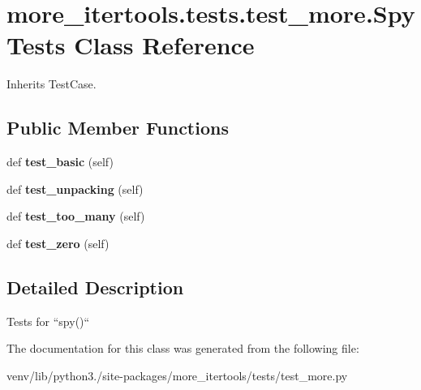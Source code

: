 \hypertarget{classmore__itertools_1_1tests_1_1test__more_1_1_spy_tests}{}\section{more\+\_\+itertools.\+tests.\+test\+\_\+more.\+Spy\+Tests Class Reference}
\label{classmore__itertools_1_1tests_1_1test__more_1_1_spy_tests}


Inherits Test\+Case.

\subsection*{Public Member Functions}
\begin{DoxyCompactItemize}
\item 
\mbox{\label{classmore__itertools_1_1tests_1_1test__more_1_1_spy_tests_a125e2532bf6fe68d4a9c34018a112f4f}} 
def {\bfseries test\+\_\+basic} (self)
\item 
\mbox{\label{classmore__itertools_1_1tests_1_1test__more_1_1_spy_tests_adb604952529d974b3f82d5656e399eb4}} 
def {\bfseries test\+\_\+unpacking} (self)
\item 
\mbox{\label{classmore__itertools_1_1tests_1_1test__more_1_1_spy_tests_a3c1e9741a72ad573f81e9d57db6a837e}} 
def {\bfseries test\+\_\+too\+\_\+many} (self)
\item 
\mbox{\label{classmore__itertools_1_1tests_1_1test__more_1_1_spy_tests_a519a719bb53776a74e3c27875dc76a0d}} 
def {\bfseries test\+\_\+zero} (self)
\end{DoxyCompactItemize}


\subsection{Detailed Description}
\begin{DoxyVerb}Tests for ``spy()``\end{DoxyVerb}
 

The documentation for this class was generated from the following file\+:\begin{DoxyCompactItemize}
\item 
venv/lib/python3./site-\/packages/more\+\_\+itertools/tests/test\+\_\+more.\+py\end{DoxyCompactItemize}
